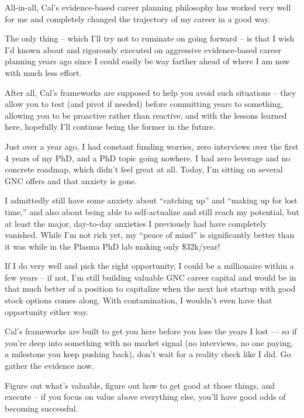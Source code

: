 \documentclass[11pt]{article}
\begin{document}
All-in-all, Cal's evidence-based career planning philosophy has worked very well for me and completely changed the trajectory of my career in a good way.

The only thing -- which I'll try not to ruminate on going forward -- is that I wish I'd known about and rigorously executed on aggressive evidence-based career planning years ago since I could easily be way farther ahead of where I am now with much less effort.

After all, Cal's frameworks are supposed to help you avoid such situations -- they allow you to test (and pivot if needed) before committing years to something, allowing you to be proactive rather than reactive, and with the lessons learned here, hopefully I'll continue being the former in the future.

Just over a year ago, I had constant funding worries, zero interviews over the first 4 years of my PhD, and a PhD topic going nowhere. I had zero leverage and no concrete roadmap, which didn't feel great at all. Today, I'm sitting on several GNC offers and that anxiety is gone.

I admittedly still have some anxiety about ``catching up'' and ``making up for lost time,'' and also about being able to self-actualize and still reach my potential, but at least the major, day-to-day anxieties I previously had have completely vanished. While I'm not rich yet, my ``peace of mind'' is significantly better than it was while in the Plasma PhD lab making only \$32k/year!

If I do very well and pick the right opportunity, I could be a millionaire within a few years -- if not, I'm still building valuable GNC career capital and would be in that much better of a position to capitalize when the next hot startup with good stock options comes along. With contamination, I wouldn't even have that opportunity either way.

Cal's frameworks are built to get you here before you lose the years I lost --- so if you're deep into something with no market signal (no interviews, no one paying, a milestone you keep pushing back), don't wait for a reality check like I did. Go gather the evidence now.

Figure out what's valuable, figure out how to get good at those things, and execute -- if you focus on value above everything else, you'll have good odds of becoming successful.
\end{document}
